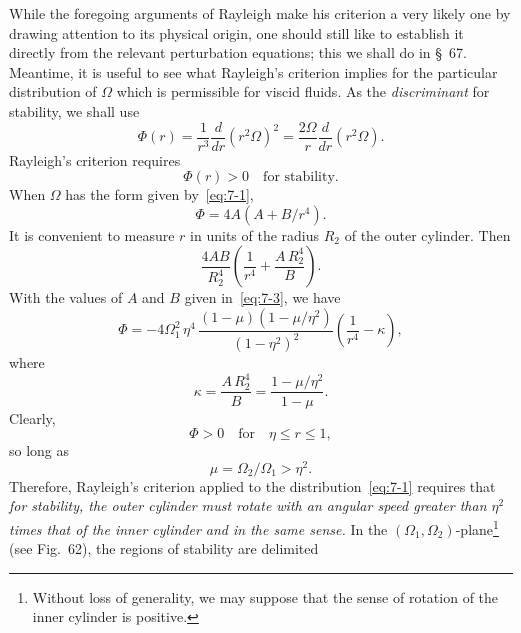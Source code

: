 While the foregoing arguments of Rayleigh make his criterion a very
likely one by drawing attention to its physical origin, one should still
like to establish it directly from the relevant perturbation equations;
this we shall do in \S~67.  Meantime, it is useful to see what Rayleigh's
criterion implies for the particular distribution of $\Omega$ which is permissible
for viscid fluids.  As the \emph{discriminant} for stability, we shall use
\begin{equation}
\label{eq:7-18}
\Phi(r) = \frac{1}{r^3}\frac{d}{dr}(r^2\Omega)^2
= \frac{2\Omega}{r}\frac{d}{dr}(r^2\Omega).
\end{equation}
Rayleigh's criterion requires
\begin{equation}
\label{eq:7-19}
\Phi(r) > 0 \quad \text{for stability.}
\end{equation}
When $\Omega$ has the form given by~\eqref{eq:7-1},
\begin{equation}
\label{eq:7-20}
\Phi = 4A(A + B/r^4).
\end{equation}
It is convenient to measure $r$ in units of the radius $R_2$ of the outer
cylinder.  Then
\begin{equation}
\label{eq:7-21}
\frac{4AB}{R_2^4}\!\left(\frac{1}{r^4}+\frac{A\,R_2^4}{B}\right).
\end{equation}
With the values of $A$ and $B$ given in~\eqref{eq:7-3}, we have
\begin{equation}
\label{eq:7-22}
\Phi = -4\Omega_1^2\,\eta^4\,\frac{(1-\mu)(1-\mu/\eta^2)}{(1-\eta^2)^2}
\!\left(\frac{1}{r^4} - \kappa\right),
\end{equation}
where
\begin{equation}
\label{eq:7-23}
\kappa = \frac{A\, R_2^4}{B} = \frac{1-\mu/\eta^2}{1-\mu}.
\end{equation}
Clearly,
\begin{equation}
\label{eq:7-24}
\Phi > 0 \quad \text{for} \quad \eta \leqslant r \leqslant 1,
\end{equation}
so long as
\begin{equation}
\label{eq:7-25}
\mu = \Omega_2/\Omega_1 > \eta^2.
\end{equation}
Therefore, Rayleigh's criterion applied to the distribution~\eqref{eq:7-1} requires
that \emph{for stability, the outer cylinder must rotate with an angular speed
greater than $\eta^2$ times that of the inner cylinder and in the same sense.}  In
the $(\Omega_1, \Omega_2)$-plane\footnote{Without loss of generality, we may suppose that the sense of rotation of the inner
cylinder is positive.} (see Fig.~62), the regions of stability are delimited
